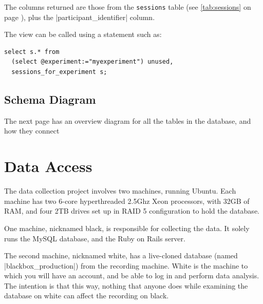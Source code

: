 \documentclass{report}
\newcommand{\myref}[1]{\autoref{#1} on page \pageref*{#1}}
\newcommand{\tabref}[1]{\lstinline|#1| table (see \myref{tab:#1})}
\begin{document}
The columns returned are those from the \tabref{sessions}, plus the
|participant_identifier| column.

The view can be called using a statement such as:

\begin{lstlisting}
select s.* from
  (select @experiment:="myexperiment") unused,
  sessions_for_experiment s;
\end{lstlisting}




\section{Schema Diagram}

The next page has an overview diagram for all the tables in the database, and
how they connect

\newpage



\chapter{Data Access}
\label{sec:data_access}

The data collection project involves two machines, running Ubuntu.  Each
machine has two 6-core hyperthreaded 2.5Ghz Xeon processors, with 32GB of RAM,
and four 2TB drives set up in RAID 5 configuration to hold the database.

One machine, nicknamed black, is
responsible for collecting the data.  It solely runs the MySQL database, and
the Ruby on Rails server.  

The second machine, nicknamed white, has a live-cloned database (named |blackbox_production|) from the recording
machine.  White is the machine to which you will have an account, and be able
to log in and perform data analysis.  The intention is that this way, nothing
that anyone does while examining the database on white can affect the
recording on black.
\end{document}
